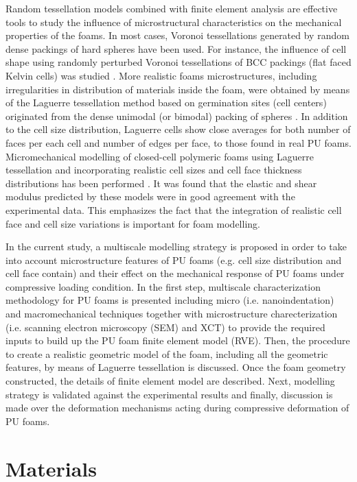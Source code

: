 \documentclass[review]{elsarticle}
\begin{document}
Random tessellation models combined with finite element analysis are effective tools to study the influence of microstructural characteristics on the mechanical properties of the foams. In most cases, Voronoi tessellations generated by random dense packings of hard spheres have been used. For instance, the influence of cell shape using randomly perturbed Voronoi tessellations of BCC packings (flat faced Kelvin cells) was studied \citep{Grenestedt19991471}. More realistic foams microstructures, including irregularities in distribution of materials inside the foam, were obtained by means of the Laguerre tessellation method based on germination sites (cell centers) originated from the dense unimodal (or bimodal) packing of spheres \citep{Redenbach201270}. In addition to the cell size distribution, Laguerre cells show close averages for both number of faces per each cell and number of edges per face, to those found in real PU foams\citep{Fan2004,Rhodes1994}. Micromechanical modelling of closed-cell polymeric foams using Laguerre tessellation and incorporating realistic cell sizes and cell face thickness distributions has been performed \citep{Chen2015150}. It was found that the elastic and shear modulus predicted by these models were in good agreement with the experimental data. This emphasizes the fact that the integration of realistic cell face and cell size variations is important for foam modelling.  

In the current study, a multiscale modelling strategy is proposed in order to take into account microstructure features of PU foams (e.g. cell size distribution and cell face contain) and their effect on the mechanical response of PU foams under compressive loading condition. In the first step, multiscale characterization methodology for PU foams is presented including micro (i.e. nanoindentation) and macromechanical techniques together with microstructure charecterization (i.e. scanning electron microscopy (SEM) and XCT) to provide the required inputs to build up the PU foam finite element model (RVE). Then, the procedure to create a realistic geometric model of the foam, including all the geometric features, by means of Laguerre tessellation is discussed. Once the foam geometry constructed, the details of finite element model are described. Next, modelling strategy is validated against the experimental results and finally, discussion is made over the deformation mechanisms acting during compressive deformation of PU foams.

\section{Materials}
\end{document}

